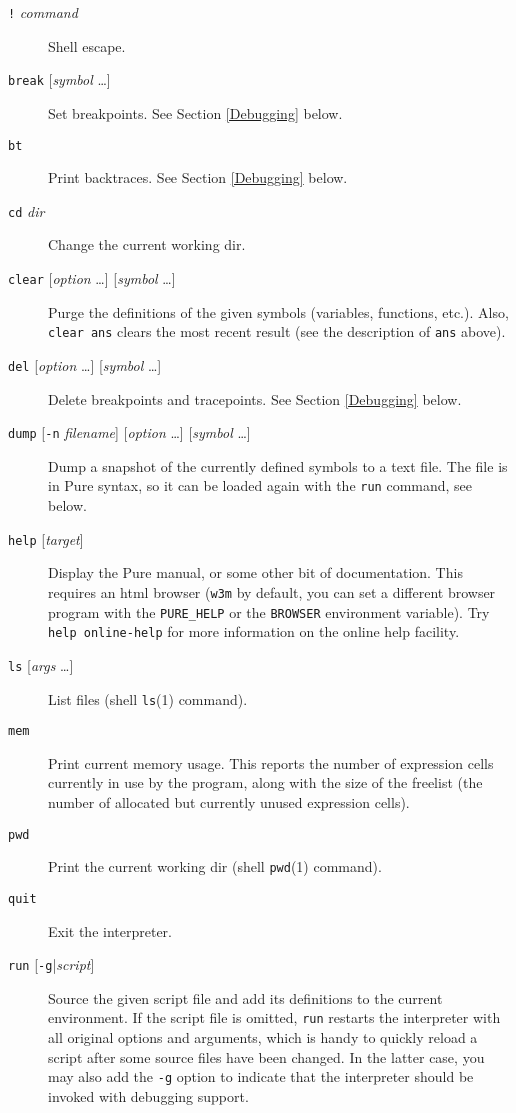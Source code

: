 \documentclass[a4paper,12pt]{article}
\newcommand{\nt}[1]{\textrm{\textit{#1\/}}}
\begin{document}
\begin{description}
\item[\rm\texttt{!} \nt{command}] Shell escape.
\item[\rm\texttt{break} {[\nt{symbol} \ldots{}]}] Set breakpoints. See Section \ref{Debugging} below.
\item[\rm\texttt{bt}] Print backtraces. See Section \ref{Debugging} below.
\item[\rm\texttt{cd} \nt{dir}] Change the current working dir.
\item[\rm\texttt{clear} {[\nt{option} \ldots{}]} {[\nt{symbol} \ldots{}]}] Purge the definitions of the given symbols (variables, functions, etc.). Also, \verb|clear ans| clears the most recent result (see the description of \verb|ans| above).
\item[\rm\texttt{del} {[\nt{option} \ldots{}]} {[\nt{symbol} \ldots{}]}] Delete breakpoints and tracepoints. See Section \ref{Debugging} below.
\item[\rm\texttt{dump} {[\texttt{-n} \nt{filename}]} {[\nt{option} \ldots{}]} {[\nt{symbol} \ldots{}]}] Dump a snapshot of the currently defined symbols to a text file. The file is in Pure syntax, so it can be loaded again with the \texttt{run} command, see below.
\item[\rm\texttt{help} {[\nt{target}]}] Display the Pure manual, or some other bit of documentation. This requires an html browser (\texttt{w3m} by default, you can set a different browser program with the \texttt{PURE\_HELP} or the \texttt{BROWSER} environment variable). Try \verb|help online-help| for more information on the online help facility.
\item[\rm\texttt{ls} {[\nt{args} \ldots{}]}] List files (shell \texttt{ls}(1) command).
\item[\rm\texttt{mem}] Print current memory usage. This reports the number of expression cells currently in use by the program, along with the size of the freelist (the number of allocated but currently unused expression cells).
\item[\rm\texttt{pwd}] Print the current working dir (shell \texttt{pwd}(1) command).
\item[\rm\texttt{quit}] Exit the interpreter.
\item[\rm\texttt{run} {[\texttt{-g}|\nt{script}]}] Source the given script file and add its definitions to the current environment. If the script file is omitted, \texttt{run} restarts the interpreter with all original options and arguments, which is handy to quickly reload a script after some source files have been changed. In the latter case, you may also add the \texttt{-g} option to indicate that the interpreter should be invoked with debugging support.

\end{description}
\end{document}
